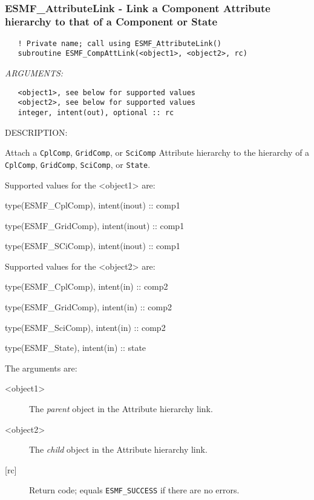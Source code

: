    
 
\mbox{}\hrulefill\ 
 
\subsubsection [ESMF\_AttributeLink] {ESMF\_AttributeLink - Link a Component Attribute hierarchy to that of a Component or State}


  
\begin{verbatim}   ! Private name; call using ESMF_AttributeLink()
   subroutine ESMF_CompAttLink(<object1>, <object2>, rc)\end{verbatim}{\em ARGUMENTS:}
\begin{verbatim}   <object1>, see below for supported values
   <object2>, see below for supported values
   integer, intent(out), optional :: rc\end{verbatim}
{\sf DESCRIPTION:\\ }


   Attach a {\tt CplComp}, {\tt GridComp}, or {\tt SciComp} Attribute
   hierarchy to the
   hierarchy of a {\tt CplComp}, {\tt GridComp}, {\tt SciComp}, or
   {\tt State}.
  
   Supported values for the <object1> are:
   \begin{description}
   \item type(ESMF\_CplComp), intent(inout) :: comp1
   \item type(ESMF\_GridComp), intent(inout) :: comp1
   \item type(ESMF\_SCiComp), intent(inout) :: comp1
   \end{description}
  
   Supported values for the <object2> are:
   \begin{description}
   \item type(ESMF\_CplComp), intent(in) :: comp2
   \item type(ESMF\_GridComp), intent(in) :: comp2
   \item type(ESMF\_SciComp), intent(in) :: comp2
   \item type(ESMF\_State), intent(in) :: state
   \end{description}
  
   The arguments are:
   \begin{description}
   \item [<object1>]
   The \textit{parent} object in the Attribute hierarchy link.
   \item [<object2>]
   The \textit{child} object in the Attribute hierarchy link.
   \item [{[rc]}]
   Return code; equals {\tt ESMF\_SUCCESS} if there are no errors.
   \end{description}
  
